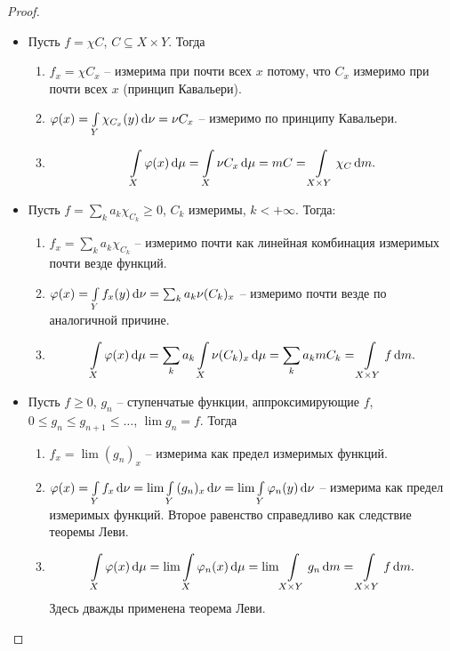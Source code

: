 \begin{proof}
    \begin{itemize}
        \item Пусть $f = \chi{C}$, $C \subseteq X \times Y$. Тогда
            \begin{enumerate}
                \item $f_x = \chi{C_x}$ -- измерима при почти всех $x$ потому, что
                    $C_x$ измеримо при почти всех $x$ (принцип Кавальери).
                \item $\varphi(x) = \int\limits_Y{\chi_{C_x}(y) \,\mathrm{d}\nu} = \nu{C_x}$ -- измеримо по 
                    принципу Кавальери.
                \item
                    \[
                        \int\limits_X{\varphi(x) \,\mathrm{d}\mu} = \int\limits_X{\nu{C_x} \,\mathrm{d}\mu} = m{C} 
                        = \int\limits_{X \times Y}{\chi_C \,\mathrm{d} m}
                    .\]
            \end{enumerate}
        \item Пусть $f = \sum_k{a_k \chi_{C_k}} \geqslant 0$, $C_k$ измеримы, $k < +\infty$. Тогда:
            \begin{enumerate}
                \item $f_x = \sum_k{a_k \chi_{C_k}}$ -- измеримо почти как линейная комбинация
                    измеримых почти везде функций.
                \item $\varphi(x) = \int\limits_Y{f_x(y) \,\mathrm{d}\nu} = \sum_k{a_k \nu{(C_k)_x}}$ -- измеримо почти везде 
                    по аналогичной причине.
                \item 
                    \[
                        \int\limits_X{\varphi(x) \,\mathrm{d}\mu} = \sum_k{a_k \int\limits_X{\nu{(C_k)_x} \,\mathrm{d}\mu}}
                            = \sum_k{a_k m{C_k}} = \int\limits_{X \times Y}{f \,\mathrm{d} m}
                    .\]
            \end{enumerate}
        \item Пусть $f \geqslant 0$, $g_n$ -- ступенчатые функции, аппроксимирующие $f$, 
            $0 \leqslant g_n \leqslant g_{n+1} \leqslant \ldots$, $\lim{g_n} = f$. Тогда
            \begin{enumerate}
                \item $f_x = \lim{(g_n)_x}$ -- измерима как предел измеримых функций.
                \item $\varphi(x) = \int\limits_Y{f_x \,\mathrm{d}\nu} = \lim{\int\limits_Y{(g_n)_x \,\mathrm{d}\nu}} 
                    = \lim{\int\limits_Y{\varphi_n(y) \,\mathrm{d}\nu}}$ -- измерима как предел измеримых функций. 
                    Второе равенство справедливо как следствие теоремы Леви.
                \item 
                    \[
                        \int\limits_X{\varphi(x) \,\mathrm{d}\mu} = \lim{\int\limits_X{\varphi_n(x) \,\mathrm{d}\mu}} = 
                        \lim{\int\limits_{X \times Y}{g_n \,\mathrm{d}m}} = \int\limits_{X \times Y}{f \,\mathrm{d} m}
                    .\]
                    Здесь дважды применена теорема Леви.
            \end{enumerate}
    \end{itemize}
\end{proof}

